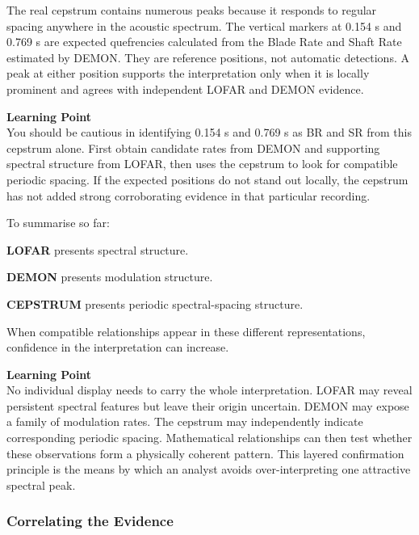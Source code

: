 The real cepstrum contains numerous peaks because it responds to regular spacing anywhere in the acoustic spectrum. The vertical markers at 0.154 s and 0.769 s are expected quefrencies calculated from the Blade Rate and Shaft Rate estimated by DEMON. They are reference positions, not automatic detections. A peak at either position supports the interpretation only when it is locally prominent and agrees with independent LOFAR and DEMON evidence.

\begin{learnpoint}
    \textbf{Learning Point} \\
    You should be cautious in identifying 0.154 s and 0.769 s as BR and SR from this cepstrum alone. First obtain candidate rates from DEMON and supporting spectral structure from LOFAR, then uses the cepstrum to look for compatible periodic spacing. If the expected positions do not stand out locally, the cepstrum has not added strong corroborating evidence in that particular recording.
\end{learnpoint}


To summarise so far:

\begin{compactitem}
    \item \textbf{LOFAR} presents spectral structure.
    \item \textbf{DEMON} presents modulation structure.
    \item \textbf{CEPSTRUM} presents periodic spectral-spacing structure.
\end{compactitem}

When compatible relationships appear in these different representations, confidence in the interpretation can increase.

\begin{learnpoint}
    \textbf{Learning Point}\\
    No individual display needs to carry the whole interpretation. LOFAR may reveal persistent spectral features but leave their origin uncertain. DEMON may expose a family of modulation rates. The cepstrum may independently indicate corresponding periodic spacing. Mathematical relationships can then test whether these observations form a physically coherent pattern. This layered confirmation principle is the means by which an analyst avoids over-interpreting one attractive spectral peak.
\end{learnpoint}

\subsubsection{Correlating the Evidence}

